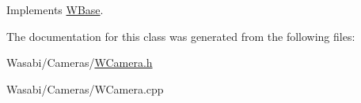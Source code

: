 Implements \hyperlink{class_w_base_a76ac973ba9a43e182f6a6a4869d69725}{W\+Base}.



The documentation for this class was generated from the following files\+:\begin{DoxyCompactItemize}
\item 
Wasabi/\+Cameras/\hyperlink{_w_camera_8h}{W\+Camera.\+h}\item 
Wasabi/\+Cameras/W\+Camera.\+cpp\end{DoxyCompactItemize}
